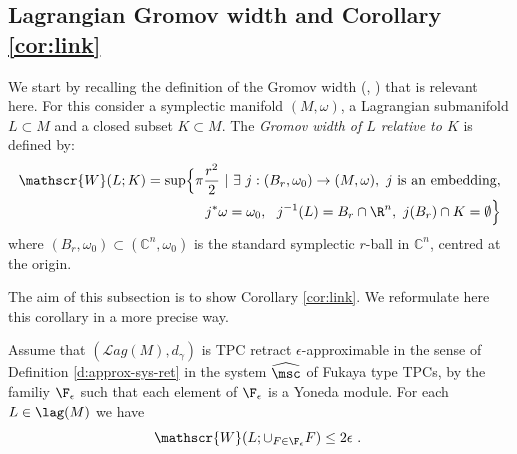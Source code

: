 \subsection{Lagrangian Gromov width and Corollary \ref{cor:link}}\label{subsec:Gw-cor}

We start by recalling the definition of the Gromov width (\cite{Bar-Cor:Serre}, \cite{Bar-Cor:NATO}) that is relevant here. For this consider a symplectic manifold
$(M,\omega)$, a Lagrangian submanifold $L\subset M$ and a closed subset $K\subset M$. The {\em Gromov width of 
$L$ relative to $K$} is defined by:
\begin{eqnarray*}\mathscr{W}(L; K)=\sup \Bigl\{ \pi \frac{r^{2}}{2} \ | \ \exists\  j: (B_{r}, \omega_{0})\to (M,\omega) , \  j \ \text{is an embedding}, \\ j^{\ast}\omega=\omega_{0}, \ \ j^{-1}(L)= B_{r}\cap \R^{n}, \ j(B_{r})\cap K=\emptyset \Bigr\} 
\end{eqnarray*}
where $(B_{r},\omega_{0})\subset (\mathbb{C}^{n},\omega_{0})$ is the standard symplectic $r$-ball in $\mathbb{C}^{n}$, centred at the origin. 

The aim of this subsection is to show Corollary \ref{cor:link}.  
We reformulate here this corollary in a more precise way.

\begin{cor}\label{cor:link2} 
Assume that $(\mathcal{L}ag (M), d_{\gamma})$ is TPC retract $\epsilon$-approximable  in the sense of Definition \ref{d:approx-sys-ret}  in the system $\widehat{\msc}$ of  Fukaya type TPCs, by the  familiy $\F_{\epsilon}$ such that each element of $\F_{\epsilon}$ is a Yoneda module. 
For each $L\in \lag(M)$ we have
$$\mathscr{W}(L;  \cup_{F\in \F_{\epsilon}}F)\leq 2\epsilon ~.~$$\end{cor}



